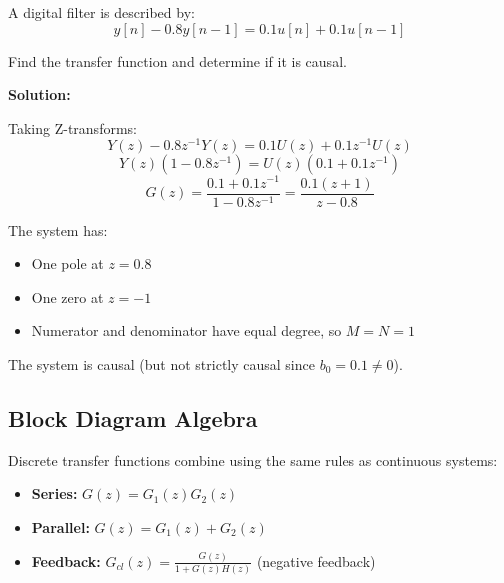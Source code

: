 \begin{example}
\label{ex:diff_eq_to_tf}

A digital filter is described by:
\begin{equation}
y[n] - 0.8 y[n-1] = 0.1 u[n] + 0.1 u[n-1]
\end{equation}

Find the transfer function and determine if it is causal.

\textbf{Solution:}

Taking Z-transforms:
\begin{equation}
Y(z) - 0.8 z^{-1} Y(z) = 0.1 U(z) + 0.1 z^{-1} U(z)
\end{equation}
\begin{equation}
Y(z)(1 - 0.8 z^{-1}) = U(z)(0.1 + 0.1 z^{-1})
\end{equation}
\begin{equation}
G(z) = \frac{0.1 + 0.1 z^{-1}}{1 - 0.8 z^{-1}} = \frac{0.1(z + 1)}{z - 0.8}
\end{equation}

The system has:
\begin{itemize}
    \item One pole at $z = 0.8$
    \item One zero at $z = -1$
    \item Numerator and denominator have equal degree, so $M = N = 1$
\end{itemize}

The system is causal (but not strictly causal since $b_0 = 0.1 \neq 0$).
\end{example}

\subsection{Block Diagram Algebra}

Discrete transfer functions combine using the same rules as continuous systems:

\begin{itemize}
    \item \textbf{Series:} $G(z) = G_1(z) G_2(z)$
    \item \textbf{Parallel:} $G(z) = G_1(z) + G_2(z)$
    \item \textbf{Feedback:} $G_{cl}(z) = \frac{G(z)}{1 + G(z)H(z)}$ (negative feedback)
\end{itemize}

